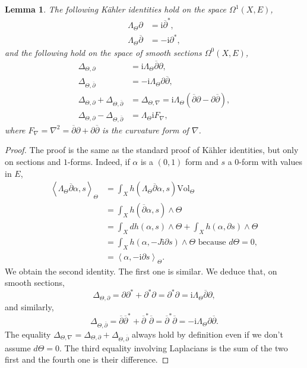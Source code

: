 \documentclass{article}
\newtheorem{lemma}[theorem]{Lemma}
\theoremstyle{remark}
\theoremstyle{definition}
\newcommand{\Vol}{\mathrm{Vol}}
\renewcommand{\i}{\boldsymbol{\mathrm{i}}}
\newcommand{\scal}[2]{\left< #1,#2 \right>}
\newcommand{\dbar}{\overline{\partial}}
\begin{document}
\begin{lemma}\label{LEM:Identités de Kähler}
    The following Kähler identities hold on the space $\Omega^1(X,E)$,
    \begin{align*}
        \Lambda_\Theta\partial & = \i\dbar^*,\\
        \Lambda_\Theta\dbar & = -\i\partial^*,
    \end{align*}
    and the following hold on the space of smooth sections $\Omega^0(X,E)$,
    \begin{align*}
        \Delta_{\Theta,\partial} & = \i\Lambda_\Theta\dbar\partial,\\
        \Delta_{\Theta,\dbar} & = -\i\Lambda_\Theta\partial\dbar,\\
        \Delta_{\Theta,\partial} + \Delta_{\Theta,\dbar} & = \Delta_{\Theta,\nabla} = \i\Lambda_\Theta(\dbar\partial - \partial\dbar),\\
        \Delta_{\Theta,\partial} - \Delta_{\Theta,\dbar} & = \Lambda_\Theta\i F_\nabla,
    \end{align*}
    where $F_\nabla = \nabla^2 = \dbar\partial + \partial\dbar$ is the curvature form of $\nabla$.
\end{lemma}
\begin{proof}
The proof is the same as the standard proof of Kähler identities, but only on sections and $1$-forms. Indeed, if $\alpha$ is a $(0,1)$ form and $s$ a $0$-form with values in $E$,
\begin{align*}
    \scal{\Lambda_\Theta\dbar\alpha}{s}_\Theta & = \int_X h(\Lambda_\Theta\dbar\alpha,s)\Vol_\Theta\\
    & = \int_X h(\dbar\alpha,s) \wedge \Theta\\
    & = \int_X dh(\alpha,s) \wedge \Theta + \int_X h(\alpha,\partial s) \wedge \Theta\\
    & = \int_X h(\alpha,-J\i\partial s) \wedge \Theta \textrm{ because } d\Theta = 0,\\
    & = \scal{\alpha}{-\i\partial s}_\Theta.
\end{align*}
We obtain the second identity. The first one is similar. We deduce that, on smooth sections,
$$
\Delta_{\Theta,\partial} = \partial\partial^* + \partial^*\partial = \partial^*\partial = \i\Lambda_\Theta\dbar\partial,
$$
and similarly,
$$
\Delta_{\Theta,\dbar} = \dbar\dbar^* + \dbar^*\dbar = \dbar^*\dbar = -\i\Lambda_\Theta\partial\dbar.
$$
The equality $\Delta_{\Theta,\nabla} = \Delta_{\Theta,\partial} + \Delta_{\Theta,\dbar}$ always hold by definition even if we don't assume $d\Theta = 0$. The third equality involving Laplacians is the sum of the two first and the fourth one is their difference.
\end{proof}
\end{document}
